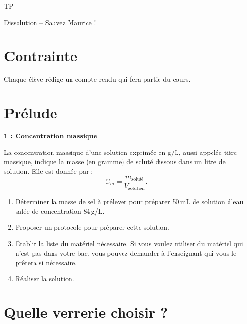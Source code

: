 




\begin{header}
TP

Dissolution -- Sauvez Maurice !
\end{header}

\section*{Contrainte}

Chaque élève rédige un compte-rendu qui fera partie du cours.

\section*{Prélude}

\begin{doc}
\textbf{1 : Concentration massique}

La concentration massique d'une solution exprimée en g/L, aussi appelée titre massique, indique la masse (en gramme) de soluté dissous dans un litre de solution.
Elle est donnée par :
\begin{equation}
C_m = \frac{m_\mathrm{soluté}}{V_\mathrm{solution}}.
\nonumber
\end{equation}
\end{doc}

\begin{enumerate}
\item \rea{} Déterminer la masse de sel à prélever pour préparer 50\,mL de solution d'eau salée de concentration 84\,g/L.
\item \anarai{} Proposer un protocole pour préparer cette solution.
\item \anarai{} Établir la liste du matériel nécessaire.
Si vous voulez utiliser du matériel qui n'est pas dans votre bac, vous pouvez demander à l'enseignant qui vous le prêtera si nécessaire.
\item \rea{} Réaliser la solution.
\end{enumerate}

\section*{Quelle verrerie choisir ?}

